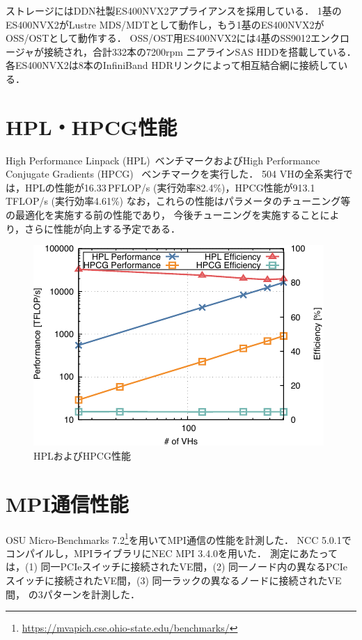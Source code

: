 ﻿\documentclass[submit,techrep,noauthor]{ipsj}
\begin{document}
ストレージにはDDN社製ES400NVX2アプライアンスを採用している．
1基のES400NVX2がLustre MDS/MDTとして動作し，もう1基のES400NVX2がOSS/OSTとして動作する．
OSS/OST用ES400NVX2には4基のSS9012エンクロージャが接続され，合計332本の7200rpm ニアラインSAS
HDDを搭載している．各ES400NVX2は8本のInfiniBand HDRリンクによって相互結合網に接続している．

\section{HPL・HPCG性能}

High Performance Linpack (HPL)~\cite{Dongarra2003}ベンチマークおよびHigh Performance Conjugate
Gradients (HPCG)~\cite{Dongarra2016} ベンチマークを実行した．
504 VHの全系実行では，HPLの性能が16.33\,PFLOP/s (実行効率82.4\%)，HPCG性能が913.1\,TFLOP/s 
(実行効率4.61\%) なお，これらの性能はパラメータのチューニング等の最適化を実施する前の性能であり，
今後チューニングを実施することにより，さらに性能が向上する予定である．

\begin{figure}
  \centering
  \includegraphics{figs/hpl_hpcg.pdf}
  \caption{HPLおよびHPCG性能}\label{fig:hpl-hpcg}
\end{figure}

\section{MPI通信性能}

OSU Micro-Benchmarks
7.2\footnote{\url{https://mvapich.cse.ohio-state.edu/benchmarks/}}を用いてMPI通信の性能を計測した．
NCC 5.0.1でコンパイルし，MPIライブラリにNEC MPI 3.4.0を用いた．
測定にあたっては，(1) 同一PCIeスイッチに接続されたVE間，(2)
同一ノード内の異なるPCIeスイッチに接続されたVE間，(3) 同一ラックの異なるノードに接続されたVE間，
の3パターンを計測した．
\end{document}
